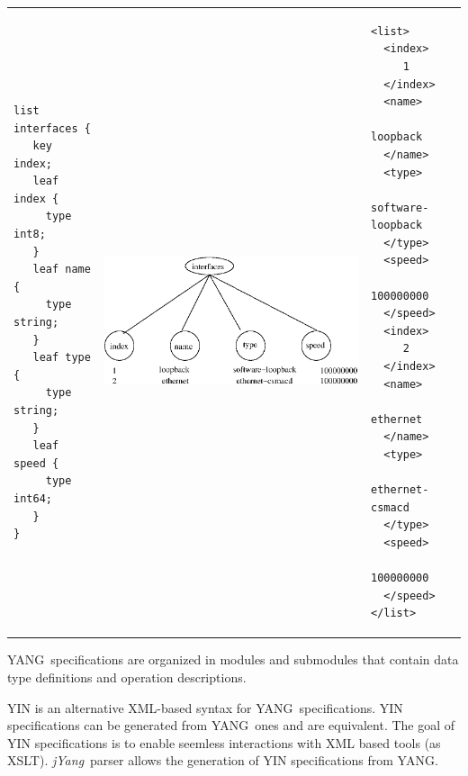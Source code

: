 \documentclass[a4paper]{article}
\begin{document}
\noindent
\begin{center}
\begin{tabular}{lcl}
\begin{minipage}{.20\textwidth}
\begin{verbatim}
list interfaces {
   key index;
   leaf index {
     type int8;
   }
   leaf name {
     type string;
   }
   leaf type {
     type string;
   }
   leaf speed {
     type int64;
   }
}
\end{verbatim}
\end{minipage}
&
\begin{minipage}{.42\textwidth}
\includegraphics[scale=.6]{listinterface.eps}
\end{minipage}
&
\begin{minipage}{.2\textwidth}
\begin{small}
\begin{verbatim}
<list>
  <index>
     1
  </index>
  <name>
     loopback
  </name>
  <type>
     software-loopback
  </type>
  <speed>
     100000000
  </speed>
  <index>
     2
  </index>
  <name>
     ethernet
  </name>
  <type>
     ethernet-csmacd
  </type>
  <speed>
     100000000
  </speed>
</list>
\end{verbatim}
\end{small}
\end{minipage}
\end{tabular}
\end{center}

YANG\ specifications are organized in modules and submodules
that contain data type definitions and operation descriptions. 


YIN is  an alternative XML-based syntax for  YANG\ specifications. YIN
specifications   can   be   generated   from  YANG\   ones   and   are
equivalent.  The goal  of  YIN specifications  is  to enable  seemless
interactions with  XML based tools  (as XSLT).  {\sl  jYang\/}\ parser
allows the generation of YIN specifications from YANG.
\end{document}
